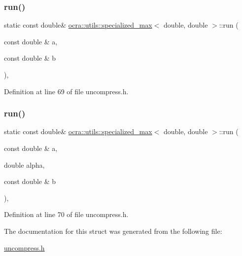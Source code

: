 \subsubsection{\texorpdfstring{run()}{run()}\hspace{0.1cm}{\footnotesize\ttfamily [1/2]}}
{\footnotesize\ttfamily static const double\& \hyperlink{structocra_1_1utils_1_1specialized__max}{ocra\+::utils\+::specialized\+\_\+max}$<$ double, double $>$\+::run (\begin{DoxyParamCaption}\item[{const double \&}]{a,  }\item[{const double \&}]{b }\end{DoxyParamCaption})\hspace{0.3cm}{\ttfamily [inline]}, {\ttfamily [static]}}



Definition at line 69 of file uncompress.\+h.

\hypertarget{structocra_1_1utils_1_1specialized__max_3_01double_00_01double_01_4_a61ca4eb326268e49b5e44cd042dde4ce}{}\label{structocra_1_1utils_1_1specialized__max_3_01double_00_01double_01_4_a61ca4eb326268e49b5e44cd042dde4ce} 
\subsubsection{\texorpdfstring{run()}{run()}\hspace{0.1cm}{\footnotesize\ttfamily [2/2]}}
{\footnotesize\ttfamily static const double\& \hyperlink{structocra_1_1utils_1_1specialized__max}{ocra\+::utils\+::specialized\+\_\+max}$<$ double, double $>$\+::run (\begin{DoxyParamCaption}\item[{const double \&}]{a,  }\item[{double}]{alpha,  }\item[{const double \&}]{b }\end{DoxyParamCaption})\hspace{0.3cm}{\ttfamily [inline]}, {\ttfamily [static]}}



Definition at line 70 of file uncompress.\+h.



The documentation for this struct was generated from the following file\+:\begin{DoxyCompactItemize}
\item 
\hyperlink{uncompress_8h}{uncompress.\+h}\end{DoxyCompactItemize}
